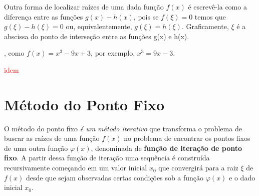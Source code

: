 Outra forma de localizar raízes de uma dada função $f(x)$ é escrevê-la como a diferença entre as funções $g(x)-h(x)$, pois se $f(\xi) = 0$ temos que $g(\xi) - h(\xi) = 0$ ou, equivalentemente, $g(\xi) = h(\xi)$. Graficamente, $\xi$ é a abscissa do ponto de interseção entre as funções g(x) e h(x).

, como $f(x) = x^3 -9x + 3$,
por exemplo, $x^3 = 9x - 3$.

\textcolor{red}{idem}





\section{Método do Ponto Fixo}

O método do ponto fixo \emph{é um método iterativo} que %
transforma o problema de buscar as raízes de uma função $f(x)$ no problema de encontrar os pontos fixos de uma outra função $\varphi(x)$, denominada de \textbf{função de iteração de ponto fixo}. %
A partir dessa função de iteração uma sequência é construída recursivamente começando em um valor inicial $x_0$ que convergirá para a raiz $\xi$ de $f(x)$ desde que sejam observadas certas condições sob a função $\varphi(x)$ e o dado inicial $x_0$.

